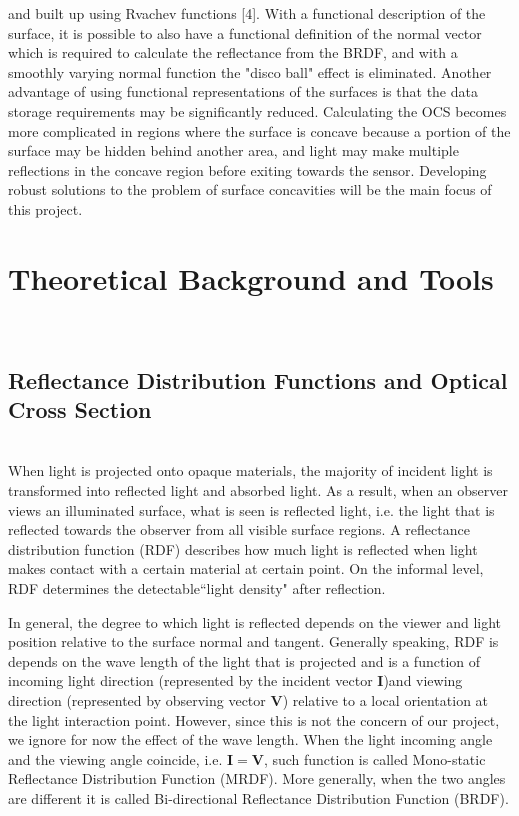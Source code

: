 \documentclass[11pt]{amsart}
\theoremstyle{definition}
\begin{document}
and built up using Rvachev functions [4]. With a functional description of the surface, it is possible to also have a functional
definition of the normal vector which is required to calculate the reflectance from the BRDF, and with a smoothly varying
normal function the "disco ball" effect is eliminated. Another advantage of using functional representations of the surfaces
is that the data storage requirements may be significantly reduced. Calculating the OCS becomes more complicated in
regions where the surface is concave because a portion of the surface may be hidden behind another area, and light may
make multiple reflections in the concave region before exiting towards the sensor. Developing robust solutions to the
problem of surface concavities will be the main focus of this project.

\section{Theoretical Background and Tools}~\\
\subsection{Reflectance Distribution Functions and Optical Cross Section}~\\
When light is projected onto opaque materials, the majority of incident light is transformed into reflected light and absorbed light. As a result, when an observer views an illuminated surface, what is seen is reflected light, i.e. the light that is reflected towards the observer from all visible surface regions. A reflectance distribution function (RDF) describes how much light is reflected when light makes contact with a certain material at certain point. On the informal level, RDF determines the detectable``light density" after reflection. 

In general, the degree to which light is reflected depends on the viewer and
light position relative to the surface normal and tangent. Generally speaking, RDF is
depends on the wave length of the light that is projected and is a function of incoming light direction (represented by the incident vector
\textbf{I})and viewing direction (represented by observing vector \textbf{V})
relative to a local orientation at the light interaction point. However, since this is not the concern of our project, we ignore for now the effect of the wave length. When the light incoming angle and the viewing angle coincide, i.e. $\mathbf{I}=\mathbf{V}$, such function is called Mono-static Reflectance Distribution Function (MRDF). More generally, when the two angles are different it is called Bi-directional Reflectance Distribution Function (BRDF). 
\end{document}

